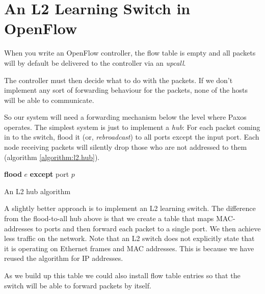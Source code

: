 \section{An L2 Learning Switch in OpenFlow}
\label{chapter:l2.learning.switch}

When you write an OpenFlow controller, the flow table is empty and all
packets will by default be delivered to the controller via an
\textit{upcall}.

The controller must then decide what to do with the packets.  If we don't
implement any sort of forwarding behaviour for the packets, none of the
hosts will be able to communicate.

So our system will need a forwarding mechanism below the level where Paxos
operates.
%
The simplest system is just to implement a \textit{hub}:  For
each packet coming in to the switch, flood it (or,
\textit{rebroadcast}) to all ports except the
input port.
%
Each node receiving packets will silently drop those who are not addressed
to them (algorithm \ref{algorithm:l2.hub}).

\begin{algorithm}
  \begin{algorithmic}
      \State \textbf{flood} $e$ \textbf{except} port $p$ 
    \EndOn
  \end{algorithmic}
  \caption{An L2 hub algorithm}
  \label{algorithm:l2.hub}
\end{algorithm}

A slightly better approach is to implement an \ac{L2} learning
switch.
The difference from the flood-to-all hub above is that we create a table
that maps MAC-addresses to ports and then forward each packet to a single
port.  We then achieve less traffic on the network.
%
Note that an \ac{L2} switch does not explicitly state that it is operating
on Ethernet frames and MAC addresses.  This is because we have reused the
algorithm for IP addresses.

As we build up this table we could also install flow table entries so that the
switch will be able to forward packets by itself.

